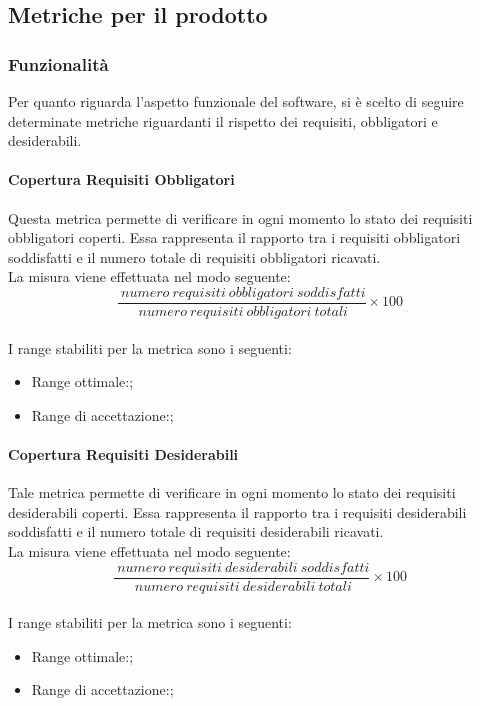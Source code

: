 	\subsection{Metriche per il prodotto}
		\subsubsection{Funzionalità \label{S1}}
		Per quanto riguarda l'aspetto funzionale del software, si è scelto di seguire determinate metriche riguardanti il rispetto dei requisiti, obbligatori e desiderabili.
			\paragraph{Copertura Requisiti Obbligatori}
			Questa metrica permette di verificare in ogni momento lo stato dei requisiti obbligatori coperti. Essa rappresenta il rapporto tra i requisiti obbligatori soddisfatti e il numero totale di requisiti obbligatori ricavati.
			\\La misura viene effettuata nel modo seguente:
			\begin{equation}
			\frac{~numero~requisiti~obbligatori~soddisfatti}{~numero~requisiti~obbligatori~totali}\times{100}
			\end{equation}
			\\I range stabiliti per la metrica sono i seguenti:
			\begin{itemize}
				\item Range ottimale:;
				\item Range di accettazione:;
			\end{itemize}
			
			\paragraph{Copertura Requisiti Desiderabili}
			Tale metrica permette di verificare in ogni momento lo stato dei requisiti desiderabili coperti. Essa rappresenta il rapporto tra i requisiti desiderabili soddisfatti e il numero totale di requisiti desiderabili ricavati.
			\\La misura viene effettuata nel modo seguente:
			\begin{equation}
			\frac{~numero~requisiti~desiderabili~soddisfatti}{~numero~requisiti~desiderabili~totali}\times{100}
			\end{equation}
			\\I range stabiliti per la metrica sono i seguenti:
			\begin{itemize}
				\item Range ottimale:;
				\item Range di accettazione:;
			\end{itemize}
